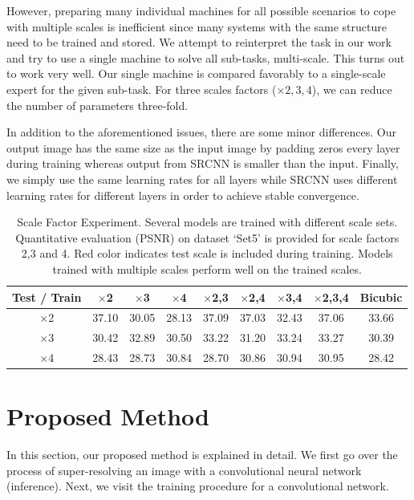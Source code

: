 \documentclass[10pt,twocolumn,letterpaper]{article}
\begin{document}
However, preparing many individual machines for all possible scenarios to cope with multiple scales is inefficient since many systems with the same structure need to be trained and stored.
We attempt to reinterpret the task in our work and try to use a single machine to solve all sub-tasks, multi-scale. This turns out to work very well. Our single machine is compared favorably to a single-scale expert for the given sub-task. For three scales factors ($\times 2,3,4$), we can reduce the number of parameters three-fold.


In addition to the aforementioned issues, there are some minor differences. Our output image has the same size as the input image by padding zeros every layer during training whereas output from SRCNN is smaller than the input. Finally, we simply use the same learning rates for all layers while SRCNN uses different learning rates for different layers in order to achieve stable convergence.

\begin{table}[t]
	\small
	\centering
\begin{tabular}
{|c|c|c|c|c|c|c|c||c|}
\hline 
 Test / Train & {$\times$2}& {$\times$3}& { $\times$4}& {$\times$2,3}& {$\times$2,4}& { $\times$3,4}& {$\times$2,3,4} & {Bicubic} \\
\hline
$\times$2  & \color{red} 37.10  & 30.05  & 28.13  & \color{red} 37.09  & \color{red} 37.03  & 32.43  & \color{red}37.06 &33.66   \\
$\times$3  & 30.42  & \color{red} 32.89  & 30.50  & \color{red} 33.22  & 31.20  & \color{red} 33.24  & \color{red} 33.27  & 30.39 \\
$\times$4  & 28.43  & 28.73  & \color{red} 30.84  & 28.70  & \color{red} 30.86  & \color{red} 30.94  & \color{red} 30.95 & 28.42  \\
\hline
\end{tabular}
	\vspace{1pt}
	\caption{Scale Factor Experiment. Several models are trained with different scale sets. Quantitative evaluation (PSNR) on dataset `Set5' is provided for scale factors 2,3 and 4.  {\color{red}Red color} indicates test scale is included during training. Models trained with multiple scales perform well on the trained scales. }
	\label{tab:SRCNN_Factor_Test}
\end{table}

\section{Proposed Method}
In this section, our proposed method is explained in detail. We first go over the process of super-resolving an image with a convolutional neural network (inference). Next, we visit the training procedure for a convolutional network.
\end{document}

